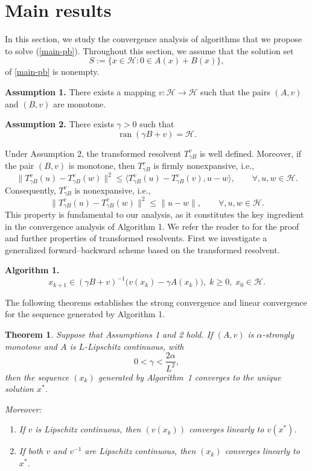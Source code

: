 \documentclass[11pt]{article}
\newtheorem{theorem}{Theorem}[section]
\theoremstyle{definition}
\theoremstyle{definition}
\theoremstyle{definition}
\begin{document}
\section{Main results}\label{sec3}

In this section, we study the convergence analysis of  algorithms that we propose to solve (\ref{main-pb}).   Throughout this section, we assume that the solution set
\[
S := \{x\in \mathcal{H} : 0\in A(x)+B(x)\},
\]
of \eqref{main-pb} is nonempty.

\medskip

\noindent\textbf{Assumption 1.} There exists a  mapping $v:\mathcal{H}\to\mathcal{H}$ such that the pairs $(A,v)$ and $(B,v)$ are monotone.

\medskip

\noindent\textbf{Assumption 2.} There exists $\gamma>0$ such that
\[
\operatorname{ran}(\gamma B+v)=\mathcal{H}.
\]

\medskip

Under Assumption 2, the transformed resolvent $T_{\gamma B}^{v}$ is well defined. Moreover, if the pair $(B,v)$ is monotone, then $T_{\gamma B}^{v}$ is firmly nonexpansive, i.e.,
\[
\|T_{\gamma B}^{v}(u)-T_{\gamma B}^{v}(w)\|^2 \le \langle T_{\gamma B}^{v}(u)-T_{\gamma B}^{v}(v),u-w\rangle,
\qquad \forall,u,w\in\mathcal{H}.
\]
Consequently, $T_{\gamma B}^{v}$ is  nonexpansive, i.e.,
\[
\|T_{\gamma B}^{v}(u)-T_{\gamma B}^{v}(w)\|^2 \le \|u-w\|,
\qquad \forall,u,w\in\mathcal{H}.
\]
This property is fundamental to our analysis, as it constitutes the key ingredient in the convergence analysis of Algorithm 1. We refer the reader to \cite{LDT} for the proof and further properties of transformed resolvents.  First  we investigate a generalized forward--backward scheme based on the transformed resolvent.

\medskip

\noindent\textbf{Algorithm 1.}
\[
x_{k+1}\in(\gamma B+v)^{-1}\bigl(v(x_k)-\gamma A(x_k)\bigr), \; k\ge 0,\; x_0\in \mathcal{H}.
\]

\medskip

The following theorems  establishes the strong convergence and  linear convergence for the sequence generated by Algorithm 1.


\begin{theorem}\label{thm1} 
Suppose that Assumptions 1 and 2 hold. If $(A,v)$ is $\alpha$-strongly monotone and $A$ is $L$-Lipschitz continuous, with
\[
0<\gamma<\frac{2\alpha}{L^2},
\]
then the sequence $(x_k)$ generated by Algorithm~1 converges to the unique solution $x^*$.

Moreover:
\begin{enumerate}
\item[(a)] If $v$ is Lipschitz continuous, then $(v(x_k))$ converges linearly to $v(x^*)$.
\item[(b)] If both $v$ and $v^{-1}$ are Lipschitz continuous, then $(x_k)$ converges linearly to $x^*$.
\end{enumerate}
\end{theorem}
\end{document}
